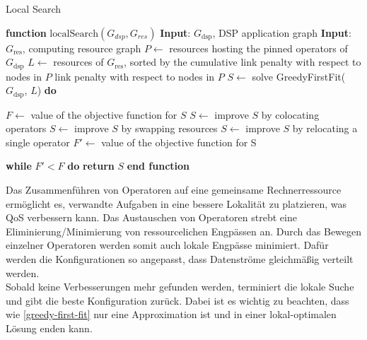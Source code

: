 \documentclass{article}
\begin{document}
\begin{minipage}{0.5\textwidth} \label{local-search-algo}
    \begin{algorithm}[H]
        \caption{Local Search}
        \begin{algorithmic}[1]
            \STATE \textbf{function} $\mathrm{localSearch}(G_{dsp}, G_{res})$
            \STATE \textbf{Input}: $G_{\text{dsp}}$, DSP application graph
            \STATE \textbf{Input}: $G_{\text{res}}$, computing resource graph
            \STATE $P \leftarrow$ resources hosting the pinned operators of $G_{\text{dsp}}$
            \STATE $L \leftarrow$ resources of $G_{\text{res}}$, 
            sorted by the cumulative link penalty with respect to nodes in $P$
            \STATE link penalty with respect to nodes in $P$
            \STATE $S \leftarrow$  solve GreedyFirstFit($G_{\text{dsp}}$, $L$)
            \STATE \textbf{do}
    
            \STATE \hspace{\algorithmicindent} $F \leftarrow$  value of the objective function for $S$
            \STATE \hspace{\algorithmicindent} $S \leftarrow$  improve $S$ by colocating operators
            \STATE \hspace{\algorithmicindent} $S \leftarrow$  improve $S$ by swapping resources
            \STATE \hspace{\algorithmicindent} $S \leftarrow$  improve $S$ by relocating a single operator
            \STATE \hspace{\algorithmicindent} $F' \leftarrow$ value of the objective function for S
    
            \STATE \textbf{while} $F'  < F$ \textbf{do}
            \STATE \hspace{\algorithmicindent} \textbf{return} $S$
            \STATE \textbf{end function}
        \end{algorithmic}
\end{algorithm}
\end{minipage}

\vspace{0.7cm}
Das Zusammenführen von Operatoren auf eine gemeinsame Rechnerressource ermöglicht es, 
verwandte Aufgaben in eine bessere Lokalität zu platzieren, was QoS verbessern kann. 
Das Austauschen von Operatoren strebt eine Eliminierung/Minimierung von ressourcelichen Engpässen an. 
Durch das Bewegen einzelner Operatoren werden somit auch lokale Engpässe minimiert.
Dafür werden die Konfigurationen so angepasst, dass  Datenströme gleichmäßig verteilt werden.   \\
Sobald keine Verbesserungen mehr gefunden werden, terminiert die lokale Suche und gibt die beste Konfiguration zurück. 
Dabei ist es wichtig zu beachten, dass wie \ref{greedy-first-fit} nur eine Approximation ist und in einer lokal-optimalen Lösung enden kann. 
\end{document}
